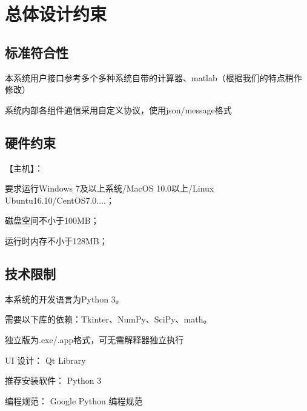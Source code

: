 \chapter{总体设计约束}


\section{标准符合性}

本系统用户接口参考多个多种系统自带的计算器、matlab（根据我们的特点稍作修改）

系统内部各组件通信采用自定义协议，使用json/message格式

\section{硬件约束}
【主机】：

要求运行Windows 7及以上系统/MacOS 10.0以上/Linux Ubuntu16.10/CentOS7.0....；

磁盘空间不小于100MB；

运行时内存不小于128MB；\\

\section{技术限制}

本系统的开发语言为Python 3。

需要以下库的依赖：Tkinter、NumPy、SciPy、math。

独立版为.exe/.app格式，可无需解释器独立执行

UI 设计： Qt Library

推荐安装软件：       Python 3

编程规范： Google Python 编程规范\\

